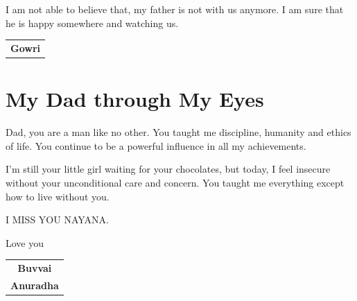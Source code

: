 I am not able to believe that, my father is not with us anymore. I am sure that he is happy somewhere and watching us.
\bigskip

\begin{flushright}
\begin{tabular}{c}
\textbf{Gowri}
\end{tabular}
\end{flushright}
\bigskip

\section*{My Dad through My Eyes}

Dad, you are a man like no other. You taught me discipline, humanity and ethics of life. You continue to be a powerful influence in all my achievements.

I’m still your little girl waiting for your chocolates, but today, I feel insecure without your unconditional care and concern. You taught me everything except how to live without you.
\bigskip

\noindent I MISS YOU NAYANA.

\noindent Love you

\begin{flushright}
\begin{tabular}{c}
\textbf{Buvvai}\\
\textbf{Anuradha}
\end{tabular}
\end{flushright}
